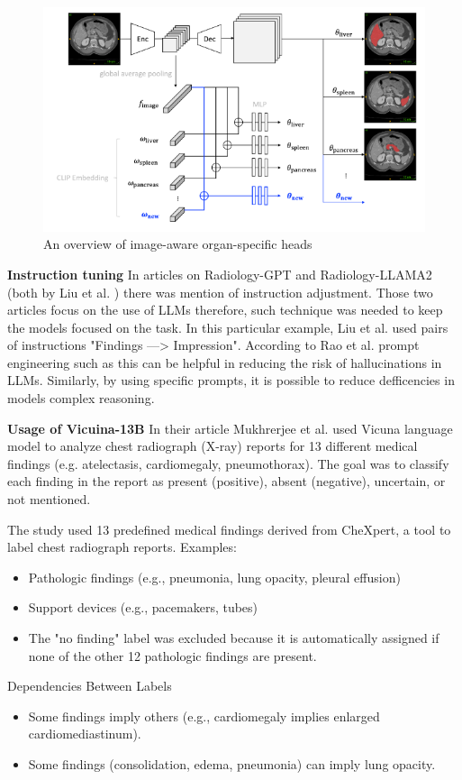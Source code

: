 \documentclass{IEEEcsmag}
\begin{document}
    \begin{figure}
        \centering
        \includegraphics[width=\linewidth]{images/Cite-1-img1.png}
        \caption{An overview of image-aware organ-specific heads}
        \label{fig:Cite-1-img1}
    \end{figure}
        
    \textbf{Instruction tuning} In articles on Radiology-GPT and Radiology-LLAMA2 (both by Liu et al. \cite{cite-2}\cite{cite-3}) there was mention of instruction adjustment.
    Those two articles focus on the use of LLMs therefore, such technique was needed to keep the models focused on the task.
    In this particular example, Liu et al. used pairs of instructions "Findings —> Impression".  
    According to Rao et al. \cite{cite-4} prompt engineering such as this can be helpful in reducing the risk of hallucinations in LLMs.
    Similarly, by using specific prompts, it is possible to reduce defficencies in models complex reasoning.
    
    \textbf{Usage of Vicuina-13B}
    In their article Mukhrerjee et al.\cite{cite-23} used Vicuna language model to analyze chest radiograph (X-ray) reports for 13 different medical findings (e.g. atelectasis, cardiomegaly, pneumothorax). The goal was to classify each finding in the report as present (positive), absent (negative), uncertain, or not mentioned.
     
    The study used 13 predefined medical findings derived from CheXpert, a tool to label chest radiograph reports.
    Examples:
        \begin{itemize}
            \item Pathologic findings (e.g., pneumonia, lung opacity, pleural effusion)
            \item Support devices (e.g., pacemakers, tubes)
            \item The "no finding" label was excluded because it is automatically assigned if none of the other 12 pathologic findings are present.
        \end{itemize}
    Dependencies Between Labels
        \begin{itemize}
            \item Some findings imply others (e.g., cardiomegaly implies enlarged cardiomediastinum).
            \item Some findings (consolidation, edema, pneumonia) can imply lung opacity.
        \end{itemize}
\end{document}
